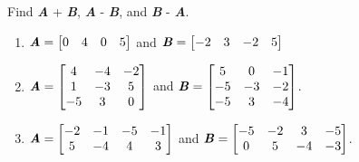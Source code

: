 \begin{Exercise}[title = {Adding and Subtracting Matrices}, label = add_mat]
Find \textbf{\textit{A}} + \textbf{\textit{B}}, \textbf{\textit{A}} - 
\textbf{\textit{B}}, and \textbf{\textit{B}} - \textbf{\textit{A}}.
\begin{enumerate}
\item $\textbf{\textit{A}} = \begin{bmatrix}
0 & 4 & 0 & 5
\end{bmatrix}$ and $\textbf{\textit{B}} = \begin{bmatrix}
-2 & 3 & -2 & 5
\end{bmatrix}$
\item $\textbf{\textit{A}} = \begin{bmatrix}
4 & -4 & -2\\
1 & -3 & 5\\
-5 & 3 & 0
\end{bmatrix}$ and $\textbf{\textit{B}} = \begin{bmatrix}
5 & 0 & -1\\
-5 & -3 & -2\\
-5 & 3 & -4
\end{bmatrix}$.
\item $\textbf{\textit{A}} = \begin{bmatrix}
-2 & -1 & -5 & -1\\
5 & -4 & 4 & 3
\end{bmatrix}$ and $\textbf{\textit{B}} = \begin{bmatrix}
-5 & -2 & 3 & -5\\
0 & 5 & -4 & -3
\end{bmatrix}$.
\end{enumerate}
\end{Exercise}

